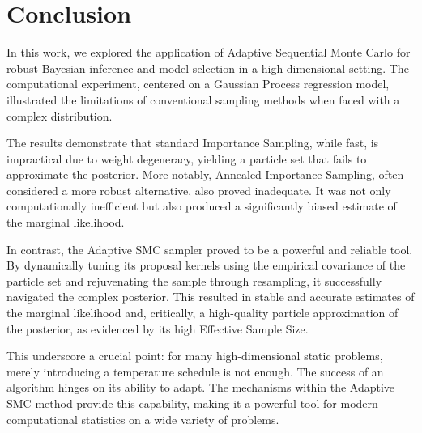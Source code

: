 \documentclass[a4paper, 12pt]{article}
\begin{document}
    \section{Conclusion}

    In this work, we explored the application of Adaptive Sequential Monte Carlo for robust Bayesian inference and model selection in a high-dimensional setting. The computational experiment, centered on a Gaussian Process regression model, illustrated the limitations of conventional sampling methods when faced with a complex distribution.

    The results demonstrate that standard Importance Sampling, while fast, is impractical due to weight degeneracy, yielding a particle set that fails to approximate the posterior. More notably, Annealed Importance Sampling, often considered a more robust alternative, also proved inadequate. It was not only computationally inefficient but also produced a significantly biased estimate of the marginal likelihood.

    In contrast, the Adaptive SMC sampler proved to be a powerful and reliable tool. By dynamically tuning its proposal kernels using the empirical covariance of the particle set and rejuvenating the sample through resampling, it successfully navigated the complex posterior. This resulted in stable and accurate estimates of the marginal likelihood and, critically, a high-quality particle approximation of the posterior, as evidenced by its high Effective Sample Size.

    This underscore a crucial point: for many high-dimensional static problems, merely introducing a temperature schedule is not enough. The success of an algorithm hinges on its ability to adapt. The mechanisms within the Adaptive SMC method provide this capability, making it a powerful tool for modern computational statistics on a wide variety of problems.

    
\end{document}
